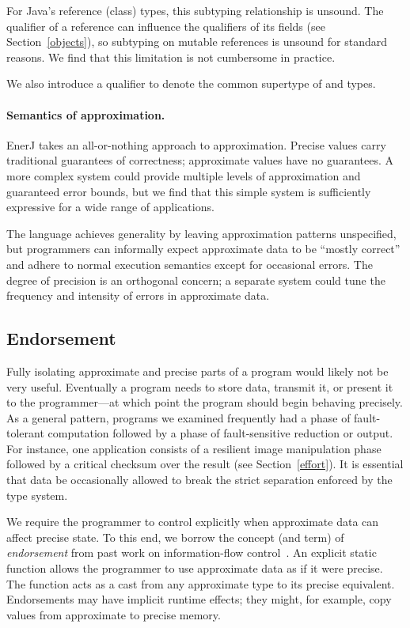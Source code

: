 For Java's reference (class) types, this
subtyping relationship is unsound. The qualifier of a reference can
influence the qualifiers of its fields (see Section~\ref{objects}),
so subtyping on mutable references is unsound for standard reasons.
We find that this limitation is not cumbersome in practice.

We also introduce a  qualifier to denote the common
supertype of  and  types.

\paragraph{Semantics of approximation.}
EnerJ takes an all-or-nothing approach to approximation.
Precise values carry traditional guarantees of correctness; approximate
values have no guarantees. A more complex system could provide
multiple levels of approximation and guaranteed error bounds, but we
find that this simple system is sufficiently expressive for a wide range
of applications.

The language achieves generality by leaving approximation patterns
unspecified, but programmers can informally expect approximate data to
be ``mostly correct'' and adhere to normal execution semantics except
for occasional errors. The degree of precision is an orthogonal concern;
a separate system could tune the frequency and intensity of errors in
approximate data.

\subsection{Endorsement}
\label{endorsement}
Fully isolating approximate and precise parts of a program would
likely not be very useful. Eventually a program needs to store data,
transmit it, or present it to the programmer---at which point the program
should begin behaving precisely. As a general pattern, programs we
examined frequently had a phase of fault-tolerant computation followed
by a phase of fault-sensitive reduction or output.
For instance, one application consists of a resilient image
manipulation phase followed by a critical checksum over
the result (see Section~\ref{effort}).
It is essential that data be
occasionally allowed to break the strict separation enforced by the type
system. %

We require the programmer to
control explicitly when approximate data can affect precise state. To
this end, we borrow the concept (and term) of {\em
  endorsement} from past work on information-flow control~\cite{endorsement}.
An explicit static function  allows the
programmer to use approximate data as if it were
precise. The function acts as a cast from any approximate type to its
precise equivalent. Endorsements may have implicit runtime effects;
they might, for example, copy values from approximate to precise memory.

